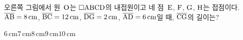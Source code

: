 \noindent\begin{minipage}[t]{0.58\linewidth}\vspace{0pt}\raggedright 오른쪽 그림에서 원~$\mathrm{O}$는 $\square\mathrm{ABCD}$의 내접원이고 네 점~$\mathrm{E}$, $\mathrm{F}$, $\mathrm{G}$, $\mathrm{H}$는 접점이다. $\overline{\mathrm{AB}}=8\,\mathrm{cm}$, $\overline{\mathrm{BC}}=12\,\mathrm{cm}$, $\overline{\mathrm{DG}}=2\,\mathrm{cm}$, $\overline{\mathrm{AD}}=6\,\mathrm{cm}$일 때, $\overline{\mathrm{CG}}$의 길이는?\end{minipage}\hfill\begin{minipage}[t]{0.4\linewidth}\vspace{0pt}\centering \resizebox{\ifdim\width>\linewidth\linewidth\else\width\fi}{!}{}\end{minipage}\par
\begin{choices32}{$6\,\mathrm{cm}$}{$7\,\mathrm{cm}$}{$8\,\mathrm{cm}$}{$9\,\mathrm{cm}$}{$10\,\mathrm{cm}$}\end{choices32}
